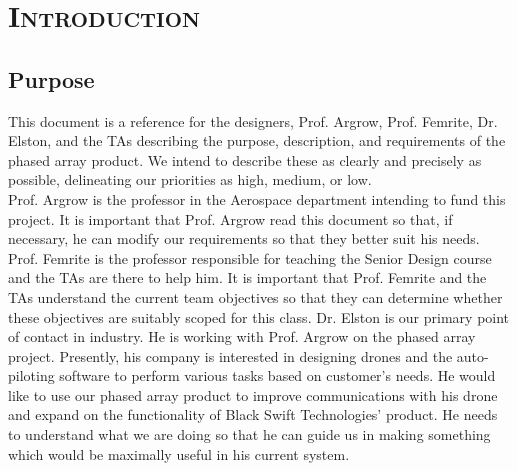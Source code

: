 \documentclass[ProductRequirements.tex]{subfiles}
\begin{document}
\bigskip

\section{\textsc{\Large Introduction}}
	
	\subsection{Purpose}
	
	This document is a reference for the designers, Prof. Argrow, Prof. Femrite, Dr. Elston, and the TAs describing the purpose, description, and requirements of the phased array product. We intend to describe these as clearly and precisely as possible, delineating our priorities as high, medium, or low. \\

Prof. Argrow is the professor in the Aerospace department intending to fund this project. It is important that Prof. Argrow read this document so that, if necessary, he can modify our requirements so that they better suit his needs. Prof. Femrite is the professor responsible for teaching the Senior Design course and the TAs are there to help him. It is important that Prof. Femrite and the TAs understand the current team objectives so that they can determine whether these objectives are suitably scoped for this class. Dr. Elston is our primary point of contact in industry. He is working with Prof. Argrow on the phased array project. Presently, his company is interested in designing drones and the auto-piloting software to perform various tasks based on customer's needs. He would like to use our phased array product to improve communications with his drone and expand on the functionality of Black Swift Technologies' product. He needs to understand what we are doing so that he can guide us in making something which would be maximally useful in his current system.
\end{document}
